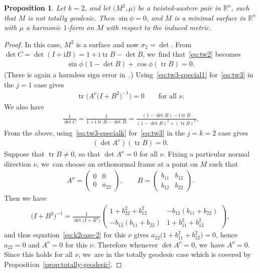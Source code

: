 \documentclass[10pt,a4paper]{amsart}
\def\R{\mathbb{R}}
\def\ri{\mathrm{i}}
\def\tr{\operatorname{tr}}
\newtheorem{Proposition}[Theorem]{Proposition}
\numberwithin{equation}{section}
\begin{document}
\begin{Proposition} \label{prop:k2}
Let $k=2$, and let $\big(M^2, \mu\big)$ be a twisted-austere pair in $\R^n$, such that $M$ is not totally geodesic. Then $\sin \phi = 0$, and $M$ is a minimal surface in $\R^n$ with $\mu$ a harmonic $1$-form on $M$ with respect to the induced metric.
\end{Proposition}
\begin{proof}
In this case, $M^2$ is a surface and now $\sigma_2 = \det$. From $\det C = \det (I + \ri B) = 1 + \ri \tr B - \det B$, we~find that~\eqref{eq:tw2} becomes
\begin{gather} \label{eq:k2case-1}
\sin \phi (1 - \det B) + \cos \phi (\tr B) = 0.
\end{gather}
(There is again a harmless sign error in~\cite[equation (2.15)]{KL}.) Using~\eqref{eq:tw3-special1} for~\eqref{eq:tw3} in the $j=1$ case gives
\begin{gather} \label{eq:k2case-2}
\tr \big(A^{\nu} \big(I + B^2\big)^{-1}\big) = 0 \qquad \text{for all $\nu$}.
\end{gather}
We also have
\begin{gather*}
\frac{1}{\det C} = \frac{1}{1 + \ri \tr B - \det B} = \frac{(1 - \det B) - \ri \tr B}{(1- \det B)^2 + (\tr B)^2}.
\end{gather*}
From the above, using~\eqref{eq:tw3-specialk} for~\eqref{eq:tw3} in the $j=k=2$ case gives
\begin{gather} \label{eq:k2case-3}
(\det A^{\nu}) (\tr B) = 0.
\end{gather}
Suppose that $\tr B \ne 0$, so that $\det A^{\nu} = 0$ for all $\nu$. Fixing a particular normal direction $\nu$, we~can choose an orthonormal frame at a point on $M$ such that
\begin{gather*}
A^{\nu} = \begin{pmatrix} 0 & 0 \\ 0 & a_{22} \end{pmatrix}, \qquad
B = \begin{pmatrix} b_{11} & b_{12} \\ b_{12} & b_{22} \end{pmatrix}.
\end{gather*}
Then we have
\begin{gather*}
\big(I + B^2\big)^{-1} = \frac{1}{\det \big(I + B^2\big)}
\begin{pmatrix} 1 + b_{22}^2 + b_{12}^2 & -b_{12}(b_{11} + b_{22}) \\ -b_{12}(b_{11} + b_{22}) & 1 + b_{11}^2 + b_{12}^2 \end{pmatrix},
\end{gather*}
and thus equation~\eqref{eq:k2case-2} for this $\nu$ gives $a_{22} \big(1 + b_{11}^2 + b_{12}^2\big) = 0$, hence $a_{22} = 0$ and $A^{\nu} = 0$ for this $\nu$.
Therefore whenever $\det A^{\nu} = 0$, we~have $A^{\nu} = 0$.
 Since this holds for all $\nu$, we~are in the totally geodesic case which is covered by Proposition~\ref{prop:totally-geodesic}.


\end{proof}
\end{document}
